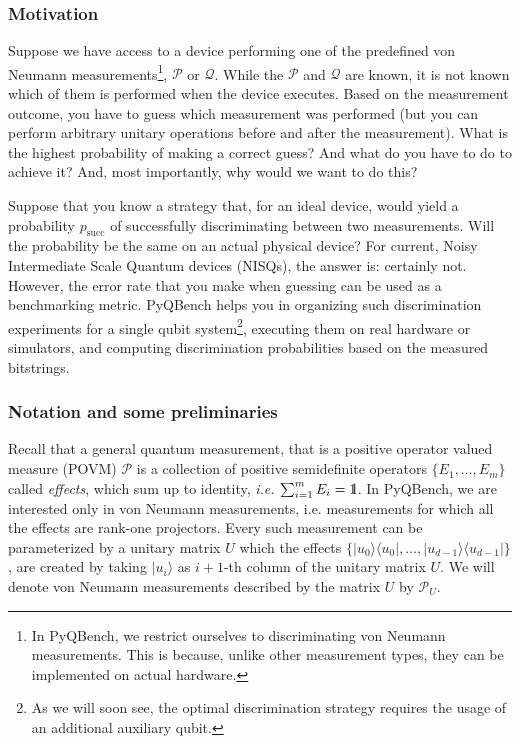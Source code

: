 \documentclass[preprint,12pt, a4paper]{elsarticle}
\newcommand{\ie}{{\emph{i.e.\/}}}
\newcommand{\ket}[1]{\ensuremath{|#1\rangle}}
\newcommand{\bra}[1]{\ensuremath{\langle#1|}}
\newcommand{\ketbra}[2]{\ensuremath{\ket{#1}\bra{#2}}}
\newcommand{\proj}[1]{\ensuremath{\ketbra{#1}{#1}}}
\newcommand{\1}{{\rm 1\hspace{-0.9mm}l}}
\newcommand{\PP}{\mathcal{P}}
\newcommand{\QQ}{\mathcal{Q}}
\begin{document}
\subsubsection{Motivation}

Suppose we have access to a device performing one of the predefined von Neumann
measurements\footnote{In PyQBench, we restrict ourselves to discriminating von Neumann measurements.
This is because, unlike other measurement types, they can be implemented on actual hardware.
},  $\PP$ or $\QQ$. While the $\PP$ and $\QQ$ are known, it is not known which of them is
performed when the device executes. Based on the measurement outcome, you have to guess which
measurement was performed (but you can perform arbitrary unitary operations before and after the
measurement). What is the highest probability of making a correct guess? And what do you have to do
to achieve it? And, most importantly, why would we want to do this?

Suppose that you know a strategy that, for an ideal device, would yield a probability
$p_{\text{succ}}$ of successfully discriminating between two measurements. Will the probability be
the same on an actual physical device? For current, Noisy Intermediate Scale Quantum devices
(NISQs), the answer is: certainly not. However, the error rate that you make when guessing can be
used as a benchmarking metric. PyQBench helps you in organizing such discrimination experiments for
a single qubit system\footnote{As we will soon see, the optimal discrimination strategy requires
the usage of an additional auxiliary qubit.}, executing them on real hardware or simulators, and
computing discrimination probabilities based on the measured bitstrings.

\subsubsection{Notation and some preliminaries}


Recall that a general quantum
measurement, that is a positive operator valued measure (POVM) $\PP$ is a
collection of positive semidefinite operators $\{E_1, \ldots, E_m \}$ called
\emph{effects}, which sum up to identity, \ie $ \, \, \sum_{i=1}^m E_i = \1$.
In PyQBench, we are interested only in von Neumann measurements, i.e. measurements
for which all the effects are rank-one projectors. Every such measurement can be
parameterized by a unitary matrix $U$ which the effects $\{\proj{u_0}, \ldots, \proj{u_{d-1}}\}$,
are created by taking $\ket{u_i}$ as  $i+1$-th column of the unitary matrix $U$.
We will denote von Neumann measurements described by the matrix $U$ by $\PP_{U}$.
\end{document}
